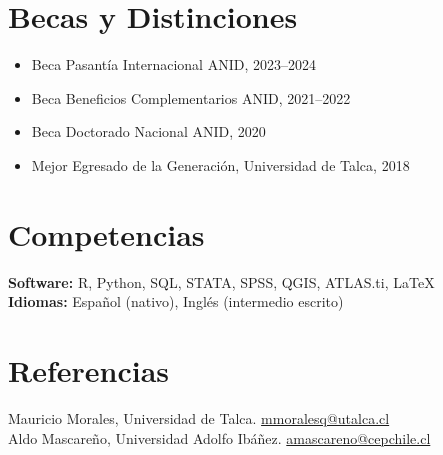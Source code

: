 \documentclass[11pt,a4paper]{article}
\begin{document}
\section{Becas y Distinciones}

\begin{itemize}[leftmargin=*, label={}]
    \item Beca Pasantía Internacional ANID, 2023--2024
    \item Beca Beneficios Complementarios ANID, 2021--2022
    \item Beca Doctorado Nacional ANID, 2020
    \item Mejor Egresado de la Generación, Universidad de Talca, 2018
\end{itemize}

\section{Competencias}

\noindent\textbf{Software:} R, Python, SQL, STATA, SPSS, QGIS, ATLAS.ti, \LaTeX\\[2pt]
\noindent\textbf{Idiomas:} Español (nativo), Inglés (intermedio escrito)

\section{Referencias}

\noindent Mauricio Morales, Universidad de Talca. \href{mailto:mmoralesq@utalca.cl}{mmoralesq@utalca.cl}\\[2pt]
\noindent Aldo Mascareño, Universidad Adolfo Ibáñez. \href{mailto:amascareno@cepchile.cl}{amascareno@cepchile.cl}
\end{document}
